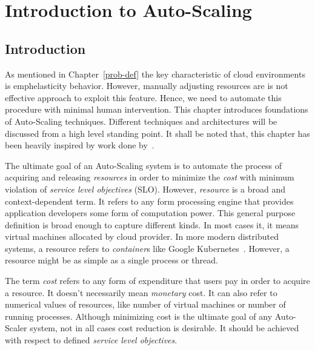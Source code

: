 \chapter{Introduction to Auto-Scaling}
\label{intro-auto-scale}

\section{Introduction}
\label{ias:intro}
As mentioned in Chapter~\ref{prob-def} the key characteristic of cloud environments is emph{elasticity} behavior. However, manually adjusting resources are is not effective approach to exploit this feature. Hence, we need to automate this procedure with minimal human intervention. This chapter introduces foundations of Auto-Scaling techniques. Different techniques and architectures will be discussed from a high level standing point. It shall be noted that, this chapter has been heavily inspired by work done by~\textcite{Lorido-Botran2014}.

The ultimate goal of an Auto-Scaling system is to automate the process of acquiring and releasing \emph{resources} in order to minimize the \emph{cost} with minimum violation of \emph{service level objectives} (SLO). However, \emph{resource} is a broad and context-dependent term. It refers to any form processing engine that provides application developers some form of computation power. This general purpose definition is broad enough to capture different kinds. In most cases it, it means virtual machines allocated by cloud provider. In more modern distributed systems, a resource refers to \emph{container}s like Google Kubernetes~\cite{kuber}. However, a resource might be as simple as a single process or thread.

The term \emph{cost} refers to any form of expenditure that users pay in order to acquire a resource. It doesn't necessarily mean \emph{monetary} cost. It can also refer to numerical values of resources, like number of virtual machines or number of running processes. Although minimizing cost is the ultimate goal of any Auto-Scaler system, not in all cases cost reduction is desirable. It should be achieved with respect to defined \emph{service level objectives}.

